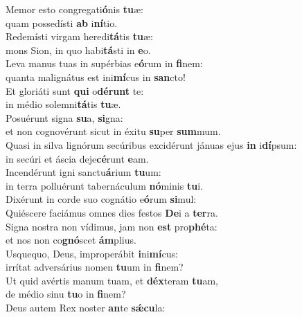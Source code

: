 \evenverse Memor esto congregati\textbf{ó}nis \textbf{tu}æ:~\*\\
\evenverse quam possedísti \textbf{ab} i\textbf{ní}tio.\\
\oddverse Redemísti virgam heredi\textbf{tá}tis \textbf{tu}æ:~\*\\
\oddverse mons Sion, in quo habi\textbf{tá}sti in \textbf{e}o.\\
\evenverse Leva manus tuas in supérbias e\textbf{ó}rum in \textbf{fi}nem:~\*\\
\evenverse quanta malignátus est ini\textbf{mí}cus in \textbf{san}cto!\\
\oddverse Et gloriáti sunt \textbf{qui} o\textbf{dé}\textbf{runt} te:~\*\\
\oddverse in médio solemni\textbf{tá}tis \textbf{tu}æ.\\
\evenverse Posuérunt signa \textbf{su}a, \textbf{si}gna:~\*\\
\evenverse et non cognovérunt sicut in éxitu \textbf{su}per \textbf{sum}mum.\\
\oddverse Quasi in silva lignórum secúribus excidérunt jánuas ejus \textbf{in} i\textbf{dí}psum:~\*\\
\oddverse in secúri et áscia deje\textbf{cé}runt \textbf{e}am.\\
\evenverse Incendérunt igni sanctu\textbf{á}rium \textbf{tu}um:~\*\\
\evenverse in terra polluérunt tabernáculum \textbf{nó}minis \textbf{tu}i.\\
\oddverse Dixérunt in corde suo cognátio e\textbf{ó}rum \textbf{si}mul:~\*\\
\oddverse Quiéscere faciámus omnes dies festos \textbf{De}i a \textbf{ter}ra.\\
\evenverse Signa nostra non vídimus, jam non \textbf{est} pro\textbf{phé}ta:~\*\\
\evenverse et nos non co\textbf{gnó}scet \textbf{ám}plius.\\
\oddverse Usquequo, Deus, improperábit \textbf{i}ni\textbf{mí}cus:~\*\\
\oddverse irrítat adversárius nomen \textbf{tu}um in \textbf{fi}nem?\\
\evenverse Ut quid avértis manum tuam, et \textbf{déx}teram \textbf{tu}am,~\*\\
\evenverse de médio sinu \textbf{tu}o in \textbf{fi}nem?\\
\oddverse Deus autem Rex noster \textbf{an}te \textbf{sǽ}\textbf{cu}la:~\*\\
